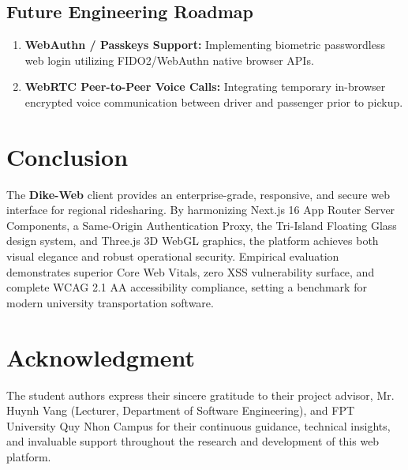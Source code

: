 \documentclass[conference,10pt,a4paper]{IEEEtran}
\begin{document}
\subsection{Future Engineering Roadmap}
\begin{enumerate}
    \item \textbf{WebAuthn / Passkeys Support:} Implementing biometric passwordless web login utilizing FIDO2/WebAuthn native browser APIs.
    \item \textbf{WebRTC Peer-to-Peer Voice Calls:} Integrating temporary in-browser encrypted voice communication between driver and passenger prior to pickup.
\end{enumerate}

\section{Conclusion}
The \textbf{Dike-Web} client provides an enterprise-grade, responsive, and secure web interface for regional ridesharing. By harmonizing Next.js 16 App Router Server Components, a Same-Origin Authentication Proxy, the Tri-Island Floating Glass design system, and Three.js 3D WebGL graphics, the platform achieves both visual elegance and robust operational security. Empirical evaluation demonstrates superior Core Web Vitals, zero XSS vulnerability surface, and complete WCAG 2.1 AA accessibility compliance, setting a benchmark for modern university transportation software.

\section*{Acknowledgment}
The student authors express their sincere gratitude to their project advisor, Mr. Huynh Vang (Lecturer, Department of Software Engineering), and FPT University Quy Nhon Campus for their continuous guidance, technical insights, and invaluable support throughout the research and development of this web platform.
\end{document}
